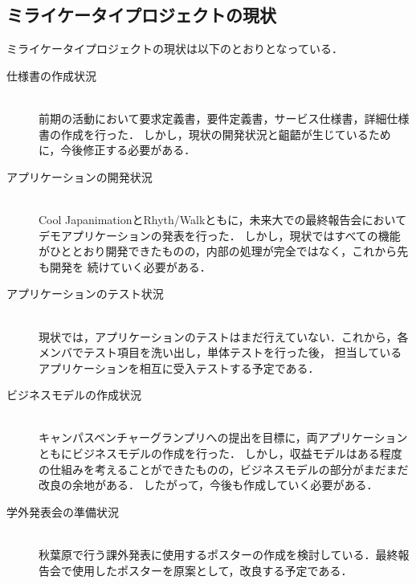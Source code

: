 \subsection{ミライケータイプロジェクトの現状}

ミライケータイプロジェクトの現状は以下のとおりとなっている．

\begin{description}

\item[仕様書の作成状況]\mbox{}\\ 
前期の活動において要求定義書，要件定義書，サービス仕様書，詳細仕様書の作成を行った．
しかし，現状の開発状況と齟齬が生じているために，今後修正する必要がある．

\item[アプリケーションの開発状況]\mbox{}\\ 
Cool JapanimationとRhyth/Walkともに，未来大での最終報告会においてデモアプリケーションの発表を行った．
しかし，現状ではすべての機能がひととおり開発できたものの，内部の処理が完全ではなく，これから先も開発を
続けていく必要がある．

\item[アプリケーションのテスト状況]\mbox{}\\ 
現状では，アプリケーションのテストはまだ行えていない．これから，各メンバでテスト項目を洗い出し，単体テストを行った後，
担当しているアプリケーションを相互に受入テストする予定である．

\item[ビジネスモデルの作成状況]\mbox{}\\ 
キャンパスベンチャーグランプリへの提出を目標に，両アプリケーションともにビジネスモデルの作成を行った．
しかし，収益モデルはある程度の仕組みを考えることができたものの，ビジネスモデルの部分がまだまだ改良の余地がある．
したがって，今後も作成していく必要がある．

\item[学外発表会の準備状況]\mbox{}\\ 
秋葉原で行う課外発表に使用するポスターの作成を検討している．最終報告会で使用したポスターを原案として，改良する予定である．

\end{description}
